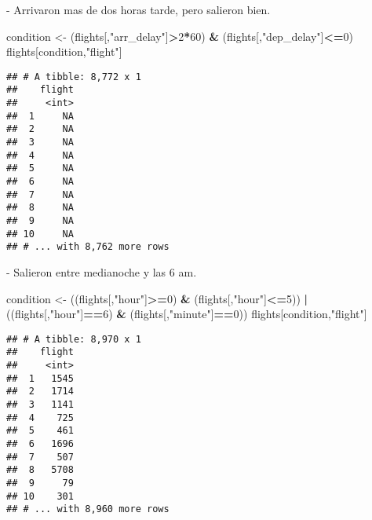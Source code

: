 \documentclass[ignorenonframetext,]{beamer}
\newenvironment{Shaded}{\begin{snugshade}}{\end{snugshade}}
\newcommand{\DecValTok}[1]{\textcolor[rgb]{0.00,0.00,0.81}{#1}}
\newcommand{\NormalTok}[1]{#1}
\newcommand{\OperatorTok}[1]{\textcolor[rgb]{0.81,0.36,0.00}{\textbf{#1}}}
\newcommand{\StringTok}[1]{\textcolor[rgb]{0.31,0.60,0.02}{#1}}
\begin{document}
\begin{frame}[fragile]

\begin{block}{- Arrivaron mas de dos horas tarde, pero salieron bien.}

\begin{Shaded}
\begin{Highlighting}[]
\NormalTok{condition <-}\StringTok{ }
\StringTok{  }\NormalTok{(flights[,}\StringTok{"arr_delay"}\NormalTok{]}\OperatorTok{>}\DecValTok{2}\OperatorTok{*}\DecValTok{60}\NormalTok{) }\OperatorTok{&}\StringTok{ }
\StringTok{  }\NormalTok{(flights[,}\StringTok{"dep_delay"}\NormalTok{]}\OperatorTok{<=}\DecValTok{0}\NormalTok{)}
\NormalTok{flights[condition,}\StringTok{"flight"}\NormalTok{]}
\end{Highlighting}
\end{Shaded}

\begin{verbatim}
## # A tibble: 8,772 x 1
##    flight
##     <int>
##  1     NA
##  2     NA
##  3     NA
##  4     NA
##  5     NA
##  6     NA
##  7     NA
##  8     NA
##  9     NA
## 10     NA
## # ... with 8,762 more rows
\end{verbatim}

\end{block}

\end{frame}

\begin{frame}[fragile]

\begin{block}{- Salieron entre medianoche y las 6 am.}

\begin{Shaded}
\begin{Highlighting}[]
\NormalTok{condition <-}\StringTok{ }
\StringTok{  }\NormalTok{((flights[,}\StringTok{"hour"}\NormalTok{]}\OperatorTok{>=}\DecValTok{0}\NormalTok{) }\OperatorTok{&}\StringTok{ }\NormalTok{(flights[,}\StringTok{"hour"}\NormalTok{]}\OperatorTok{<=}\DecValTok{5}\NormalTok{)) }\OperatorTok{|}\StringTok{ }
\StringTok{  }\NormalTok{((flights[,}\StringTok{"hour"}\NormalTok{]}\OperatorTok{==}\DecValTok{6}\NormalTok{) }\OperatorTok{&}\StringTok{ }\NormalTok{(flights[,}\StringTok{"minute"}\NormalTok{]}\OperatorTok{==}\DecValTok{0}\NormalTok{))}
\NormalTok{flights[condition,}\StringTok{"flight"}\NormalTok{]}
\end{Highlighting}
\end{Shaded}

\begin{verbatim}
## # A tibble: 8,970 x 1
##    flight
##     <int>
##  1   1545
##  2   1714
##  3   1141
##  4    725
##  5    461
##  6   1696
##  7    507
##  8   5708
##  9     79
## 10    301
## # ... with 8,960 more rows
\end{verbatim}

\end{block}

\end{frame}
\end{document}
